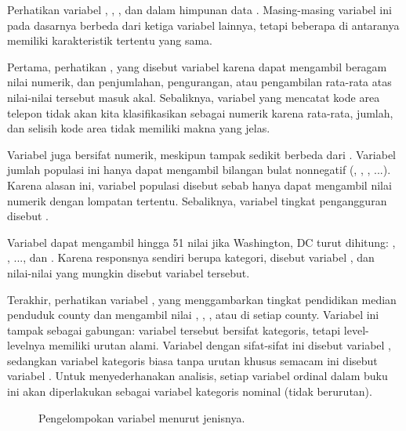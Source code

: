 Perhatikan variabel , , ,
dan  dalam himpunan data .
Masing-masing variabel ini pada dasarnya berbeda dari ketiga variabel
lainnya, tetapi beberapa di antaranya memiliki karakteristik tertentu yang sama.

Pertama, perhatikan ,
yang disebut variabel  karena dapat
mengambil beragam nilai numerik,
dan penjumlahan, pengurangan, atau pengambilan rata-rata
atas nilai-nilai tersebut masuk akal.
Sebaliknya, variabel yang mencatat kode area telepon tidak akan
kita klasifikasikan sebagai numerik karena rata-rata, jumlah, dan
selisih kode area tidak memiliki makna yang jelas.

Variabel  juga bersifat numerik, meskipun tampak
sedikit berbeda dari .
Variabel jumlah populasi ini hanya dapat mengambil bilangan bulat
nonnegatif (, , , ...).
Karena alasan ini, variabel populasi disebut 
sebab hanya dapat mengambil nilai numerik dengan lompatan tertentu.
Sebaliknya, variabel tingkat pengangguran disebut .

Variabel  dapat mengambil hingga 51 nilai jika
Washington, DC turut dihitung: , , ...,
dan .
Karena responsnya sendiri berupa kategori,
 disebut variabel ,
dan nilai-nilai yang mungkin disebut  variabel tersebut.

Terakhir, perhatikan variabel ,
yang menggambarkan tingkat pendidikan median penduduk county
dan mengambil nilai
, ,
, atau 
di setiap county.
Variabel ini tampak sebagai gabungan: variabel tersebut bersifat kategoris,
tetapi level-levelnya memiliki urutan alami.
Variabel dengan sifat-sifat ini disebut variabel ,
sedangkan variabel kategoris biasa tanpa urutan khusus semacam ini
disebut variabel .
Untuk menyederhanakan analisis, setiap variabel ordinal dalam buku ini
akan diperlakukan sebagai variabel kategoris nominal (tidak berurutan).

\begin{figure}[h]
  \centering
  \caption{Pengelompokan variabel menurut jenisnya.}
  \label{variables}
\end{figure}


